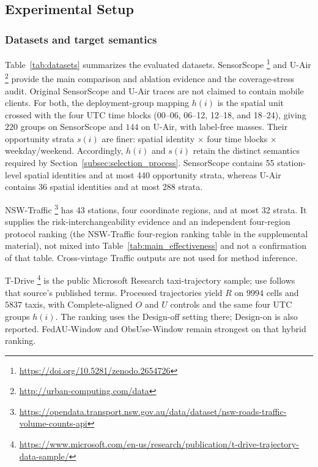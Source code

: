 \documentclass[letterpaper,journal]{IEEEtran}
\begin{document}
\subsection{Experimental Setup}
\label{subsec:eval_setup}

\subsubsection{Datasets and target semantics}

Table~\ref{tab:datasets} summarizes the evaluated datasets.  SensorScope
\cite{ingelrest2010sensorscope,barrenetxea2019sensorscope}\footnote{\url{https://doi.org/10.5281/zenodo.2654726}}
and U-Air
\cite{zheng2013uair}\footnote{\url{http://urban-computing.com/data}}
provide the main comparison and ablation evidence and the coverage-stress audit.
Original SensorScope and U-Air traces are not claimed to contain mobile
clients.  For both, the deployment-group mapping $h(i)$ is the spatial unit
crossed with the four UTC time blocks (00--06, 06--12, 12--18, and 18--24),
giving $220$ groups on SensorScope and $144$ on U-Air, with label-free
masses.  Their opportunity strata $s(i)$ are finer: spatial identity
$\times$ four time blocks $\times$ weekday/weekend.
Accordingly, $h(i)$ and $s(i)$ retain the distinct semantics required by
Section~\ref{subsec:selection_process}.  SensorScope contains 55 station-level
spatial identities and at most 440 opportunity strata, whereas U-Air contains
36 spatial identities and at most 288 strata.

NSW-Traffic
\cite{tfnsw2024traffic}\footnote{\url{https://opendata.transport.nsw.gov.au/data/dataset/nsw-roads-traffic-volume-counts-api}}
has 43 stations, four coordinate regions, and at most 32 strata.  It
supplies the risk-interchangeability evidence and an independent four-region protocol ranking
(the NSW-Traffic four-region ranking table in the supplemental material), not mixed into
Table~\ref{tab:main_effectiveness} and not a confirmation of that table.  Cross-vintage Traffic outputs are
not used for method inference.

T-Drive
\cite{yuan2010tdrive}\footnote{\url{https://www.microsoft.com/en-us/research/publication/t-drive-trajectory-data-sample/}}
is the public Microsoft Research taxi-trajectory sample; use follows that
source's published terms.  Processed trajectories yield $R$ on $9994$
cells and $5837$ taxis, with Complete-aligned $O$ and $U$ controls and
the same four UTC groups $h(i)$.  The ranking uses the Design-off setting
there; Design-on is also reported.  FedAU-Window and ObsUse-Window remain strongest
on that hybrid ranking.
\end{document}
